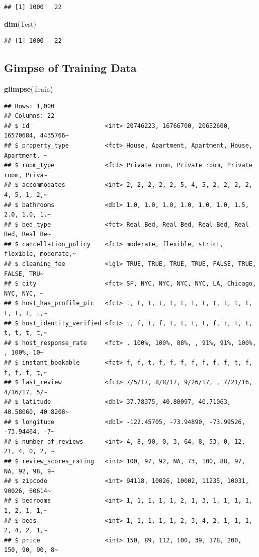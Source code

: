 \documentclass[]{book}
\newenvironment{Shaded}{\begin{snugshade}}{\end{snugshade}}
\newcommand{\KeywordTok}[1]{\textcolor[rgb]{0.13,0.29,0.53}{\textbf{#1}}}
\newcommand{\NormalTok}[1]{#1}
\begin{document}
\begin{verbatim}
## [1] 1000   22
\end{verbatim}

\begin{Shaded}
\begin{Highlighting}[]
\KeywordTok{dim}\NormalTok{(Test)}
\end{Highlighting}
\end{Shaded}

\begin{verbatim}
## [1] 1000   22
\end{verbatim}

\subsection{Gimpse of Training Data}\label{gimpse-of-training-data}

\begin{Shaded}
\begin{Highlighting}[]
\KeywordTok{glimpse}\NormalTok{(Train)}
\end{Highlighting}
\end{Shaded}

\begin{verbatim}
## Rows: 1,000
## Columns: 22
## $ id                     <int> 20746223, 16766700, 20652600, 16570684, 4435766~
## $ property_type          <fct> House, Apartment, Apartment, House, Apartment, ~
## $ room_type              <fct> Private room, Private room, Private room, Priva~
## $ accommodates           <int> 2, 2, 2, 2, 2, 5, 4, 5, 2, 2, 2, 2, 4, 5, 1, 2,~
## $ bathrooms              <dbl> 1.0, 1.0, 1.0, 1.0, 1.0, 1.0, 1.5, 2.0, 1.0, 1.~
## $ bed_type               <fct> Real Bed, Real Bed, Real Bed, Real Bed, Real Be~
## $ cancellation_policy    <fct> moderate, flexible, strict, flexible, moderate,~
## $ cleaning_fee           <lgl> TRUE, TRUE, TRUE, TRUE, FALSE, TRUE, FALSE, TRU~
## $ city                   <fct> SF, NYC, NYC, NYC, NYC, LA, Chicago, NYC, NYC, ~
## $ host_has_profile_pic   <fct> t, t, t, t, t, t, t, t, t, t, t, t, t, t, t, t,~
## $ host_identity_verified <fct> t, f, t, f, t, t, t, t, f, t, t, t, t, t, t, t,~
## $ host_response_rate     <fct> , 100%, 100%, 88%, , 91%, 91%, 100%, , 100%, 10~
## $ instant_bookable       <fct> f, f, t, f, f, f, f, f, f, f, t, f, f, f, f, t,~
## $ last_review            <fct> 7/5/17, 8/8/17, 9/26/17, , 7/21/16, 4/16/17, 5/~
## $ latitude               <dbl> 37.78375, 40.80097, 40.71063, 40.58060, 40.8208~
## $ longitude              <dbl> -122.45705, -73.94890, -73.99526, -73.94464, -7~
## $ number_of_reviews      <int> 4, 8, 90, 0, 3, 64, 8, 53, 0, 12, 21, 4, 0, 2, ~
## $ review_scores_rating   <int> 100, 97, 92, NA, 73, 100, 88, 97, NA, 92, 98, 9~
## $ zipcode                <int> 94118, 10026, 10002, 11235, 10031, 90026, 60614~
## $ bedrooms               <int> 1, 1, 1, 1, 1, 2, 1, 3, 1, 1, 1, 1, 1, 2, 1, 1,~
## $ beds                   <int> 1, 1, 1, 1, 1, 2, 3, 4, 2, 1, 1, 1, 2, 4, 2, 1,~
## $ price                  <int> 150, 89, 112, 100, 39, 178, 200, 150, 90, 90, 8~
\end{verbatim}
\end{document}
